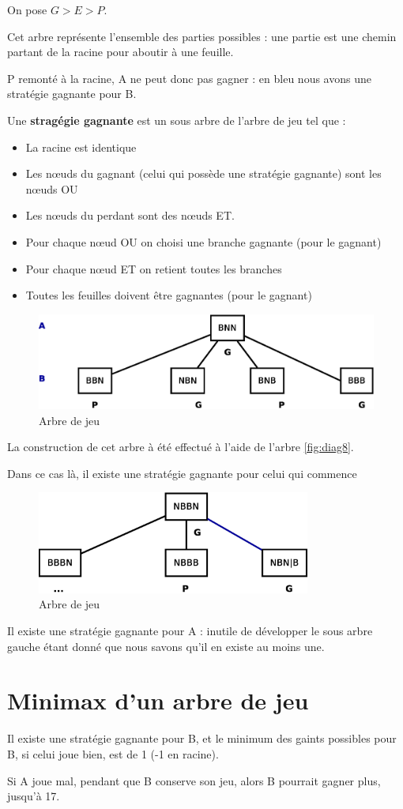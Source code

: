 \documentclass[12pt,a4paper,openany]{book}
\begin{document}
	On pose $G > E > P$.

	Cet arbre représente l'ensemble des parties possibles :
	une partie est une chemin partant de la racine pour
	aboutir à une feuille.

	P remonté à la racine, A ne peut donc pas gagner : en bleu nous avons une stratégie gagnante pour B.

	\begin{definition}
		Une \textbf{stragégie gagnante} est un sous arbre de
		l'arbre de jeu tel que : 
		\begin{itemize}
			\item La racine est identique
			\item Les n\oe{}uds du gagnant (celui qui possède
				une stratégie gagnante) sont les
				n\oe{}uds OU
			\item Les nœuds du perdant sont des nœuds ET.
			\item Pour chaque nœud OU on choisi une branche
				gagnante (pour le gagnant)
			\item Pour chaque nœud ET on retient toutes les
				branches
			\item Toutes les feuilles doivent être gagnantes
				(pour le gagnant)
		\end{itemize}
	\end{definition}
	\begin{figure}[H]
		\centering
		\includegraphics[width=12cm]{Diagramme9.eps}
		\caption{Arbre de jeu}
	\end{figure}
\begin{remarque}
	La construction de cet arbre à été effectué à l'aide de
	l'arbre \ref{fig:diag8}.
\end{remarque}
	Dans ce cas là, il existe une stratégie gagnante pour celui  
	qui commence

	\begin{figure}[H]
		\centering
		\includegraphics[width=9cm]{Diagramme10.eps}
		\caption{Arbre de jeu}
	\end{figure}
	Il existe une stratégie gagnante pour A : inutile de
	développer le sous arbre gauche étant donné que nous
	savons qu'il en existe au moins une. 

	\section{Minimax d'un arbre de jeu}
	Il existe une stratégie gagnante pour B, et le minimum
	des gaints possibles pour B, si celui joue bien, est de 1
	(-1 en racine).

	Si A joue mal, pendant que B conserve son jeu, alors B
	pourrait gagner plus, jusqu'à 17.
	\appendix
	\lstlistoflistings
\end{document}

